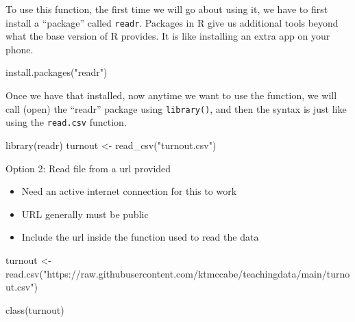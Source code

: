 \documentclass[
  letterpaper,
  DIV=11,
  numbers=noendperiod]{scrreprt}
\newenvironment{Shaded}{\begin{snugshade}}{\end{snugshade}}
\newcommand{\FunctionTok}[1]{\textcolor[rgb]{0.28,0.35,0.67}{#1}}
\newcommand{\NormalTok}[1]{\textcolor[rgb]{0.00,0.23,0.31}{#1}}
\newcommand{\OtherTok}[1]{\textcolor[rgb]{0.00,0.23,0.31}{#1}}
\newcommand{\StringTok}[1]{\textcolor[rgb]{0.13,0.47,0.30}{#1}}
\providecommand{\tightlist}{%
  \setlength{\itemsep}{0pt}\setlength{\parskip}{0pt}}\usepackage{longtable,booktabs,array}
\begin{document}
To use this function, the first time we will go about using it, we have
to first install a ``package'' called \texttt{readr}. Packages in R give
us additional tools beyond what the base version of R provides. It is
like installing an extra app on your phone.

\begin{Shaded}
\begin{Highlighting}[]
\FunctionTok{install.packages}\NormalTok{(}\StringTok{"readr"}\NormalTok{)}
\end{Highlighting}
\end{Shaded}

Once we have that installed, now anytime we want to use the function, we
will call (open) the ``readr'' package using \texttt{library()}, and
then the syntax is just like using the \texttt{read.csv} function.

\begin{Shaded}
\begin{Highlighting}[]
\FunctionTok{library}\NormalTok{(readr)}
\NormalTok{turnout }\OtherTok{\textless{}{-}} \FunctionTok{read\_csv}\NormalTok{(}\StringTok{"turnout.csv"}\NormalTok{)}
\end{Highlighting}
\end{Shaded}

Option 2: Read file from a url provided

\begin{itemize}
\tightlist
\item
  Need an active internet connection for this to work
\item
  URL generally must be public
\item
  Include the url inside the function used to read the data
\end{itemize}

\begin{Shaded}
\begin{Highlighting}[]
\NormalTok{turnout }\OtherTok{\textless{}{-}} \FunctionTok{read.csv}\NormalTok{(}\StringTok{"https://raw.githubusercontent.com/ktmccabe/teachingdata/main/turnout.csv"}\NormalTok{)}
\end{Highlighting}
\end{Shaded}

\begin{Shaded}
\begin{Highlighting}[]
\FunctionTok{class}\NormalTok{(turnout)}
\end{Highlighting}
\end{Shaded}
\end{document}
